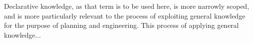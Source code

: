 Declarative knowledge, as that term is to be used here, is more narrowly scoped, and is more particularly relevant to the process of exploiting general knowledge for the purpose of planning and engineering.
This process of applying general knowledge... 

\cite{dretske1981}





